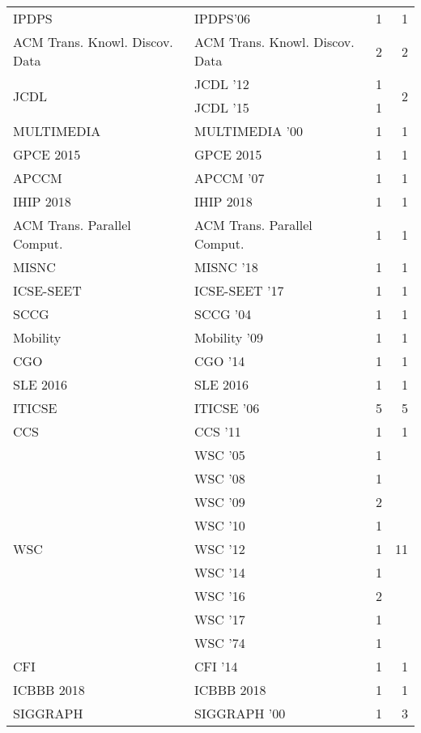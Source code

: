 \begin{table*}[t]
\begin{tabular}{llrr}
\multirow{1}{*}{IPDPS} & IPDPS'06 & 1 & \multirow{1}{*}{1}\\
\multirow{1}{*}{ACM Trans. Knowl. Discov. Data} & ACM Trans. Knowl. Discov. Data & 2 & \multirow{1}{*}{2}\\
\multirow{2}{*}{JCDL } & JCDL '12 & 1 & \multirow{2}{*}{2}\\
& JCDL '15 & 1 &\\
\multirow{1}{*}{MULTIMEDIA } & MULTIMEDIA '00 & 1 & \multirow{1}{*}{1}\\
\multirow{1}{*}{GPCE 2015} & GPCE 2015 & 1 & \multirow{1}{*}{1}\\
\multirow{1}{*}{APCCM } & APCCM '07 & 1 & \multirow{1}{*}{1}\\
\multirow{1}{*}{IHIP 2018} & IHIP 2018 & 1 & \multirow{1}{*}{1}\\
\multirow{1}{*}{ACM Trans. Parallel Comput.} & ACM Trans. Parallel Comput. & 1 & \multirow{1}{*}{1}\\
\multirow{1}{*}{MISNC } & MISNC '18 & 1 & \multirow{1}{*}{1}\\
\multirow{1}{*}{ICSE-SEET } & ICSE-SEET '17 & 1 & \multirow{1}{*}{1}\\
\multirow{1}{*}{SCCG } & SCCG '04 & 1 & \multirow{1}{*}{1}\\
\multirow{1}{*}{Mobility } & Mobility '09 & 1 & \multirow{1}{*}{1}\\
\multirow{1}{*}{CGO } & CGO '14 & 1 & \multirow{1}{*}{1}\\
\multirow{1}{*}{SLE 2016} & SLE 2016 & 1 & \multirow{1}{*}{1}\\
\multirow{1}{*}{ITICSE } & ITICSE '06 & 5 & \multirow{1}{*}{5}\\
\multirow{1}{*}{CCS } & CCS '11 & 1 & \multirow{1}{*}{1}\\
\multirow{9}{*}{WSC } & WSC '05 & 1 & \multirow{9}{*}{11}\\
& WSC '08 & 1 &\\
& WSC '09 & 2 &\\
& WSC '10 & 1 &\\
& WSC '12 & 1 &\\
& WSC '14 & 1 &\\
& WSC '16 & 2 &\\
& WSC '17 & 1 &\\
& WSC '74 & 1 &\\
\multirow{1}{*}{CFI } & CFI '14 & 1 & \multirow{1}{*}{1}\\
\multirow{1}{*}{ICBBB 2018} & ICBBB 2018 & 1 & \multirow{1}{*}{1}\\
\multirow{3}{*}{SIGGRAPH } & SIGGRAPH '00 & 1 & \multirow{3}{*}{3}\\

\end{tabular}
\end{table*}
